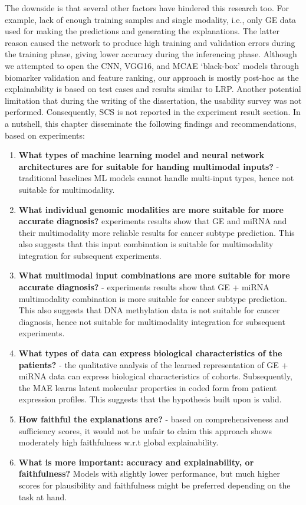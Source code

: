 \hspace*{3.5mm} The downside is that several other factors have hindered this research too. For example, lack of enough training samples and single modality, i.e., only GE data used for making the predictions and generating the explanations. The latter reason caused the network to produce high training and validation errors during the training phase, giving lower accuracy during the inferencing phase. Although we attempted to open the CNN, VGG16, and MCAE `black-box' models through biomarker validation and feature ranking, our approach is mostly post-hoc as the explainability is based on test cases and results similar to LRP. Another potential limitation that during the writing of the dissertation, the usability survey was not performed. Consequently, SCS is not reported in the experiment result section. %
In a nutshell, this chapter disseminate the following findings and recommendations, based on experiments:  

\begin{enumerate}[noitemsep]
    \item \textbf{What types of machine learning model and neural network architectures are for suitable for handing multimodal inputs?} - traditional baselines ML models cannot handle multi-input types, hence not suitable for multimodality. 
    \item \textbf{What individual genomic modalities are more suitable for more accurate diagnosis?} experiments results show that GE and miRNA and their multimodality more reliable results for cancer subtype prediction. This also suggests that this input combination is suitable for multimodality integration for subsequent experiments. 
    \item \textbf{What multimodal input combinations are more suitable for more accurate diagnosis?} - experiments results show that GE + miRNA multimodality combination is more suitable for cancer subtype prediction. This also suggests that DNA methylation data is not suitable for cancer diagnosis, hence not suitable for multimodality integration for subsequent experiments.
    \item \textbf{What types of data can express biological characteristics of the patients?} - the qualitative analysis of the learned representation of GE + miRNA data can express biological characteristics of cohorts. Subsequently, the MAE learns latent molecular properties in coded form from patient expression profiles. This suggests that the hypothesis built upon is valid. 
    \item \textbf{How faithful the explanations are?} - based on comprehensiveness and sufficiency scores, it would not be unfair to claim this approach shows moderately high faithfulness w.r.t global explainability.   
    \item \textbf{What is more important: accuracy and explainability, or faithfulness?} Models with slightly lower performance, but much higher scores for plausibility and faithfulness might be preferred depending on the task at hand. 
\end{enumerate}

